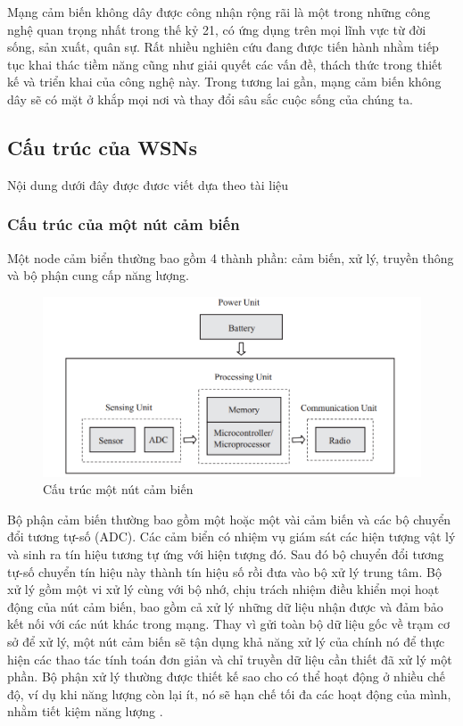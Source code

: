 \documentclass{article}
\begin{document}
Mạng cảm biến không dây được công nhận rộng rãi là một trong những công nghệ quan trọng nhất trong thế kỷ 21, có ứng dụng trên mọi lĩnh vực từ đời sống, sản xuất, quân sự. Rất nhiều nghiên cứu đang được tiến hành nhằm tiếp tục khai thác tiềm năng cũng như giải quyết các vấn đề, thách thức trong thiết kế và triển khai của công nghệ này. Trong tương lai gần, mạng cảm biến không dây sẽ có mặt ở khắp mọi nơi và thay đổi sâu sắc cuộc sống của chúng ta. 

\subsection{Cấu trúc của \gls{WSNs}}
Nội dung dưới đây được đươc viết dựa theo tài liệu \cite{architecture}
\subsubsection{Cấu trúc của một nút cảm biến}
Một node cảm biển thường bao gồm 4 thành phần: cảm biến, xử lý, truyền thông và bộ phận cung cấp năng lượng. 
\begin{figure}[ht]
\includegraphics[width=\textwidth]{images/node-structure.PNG}
\caption{Cấu trúc một nút cảm biến \cite{architecture}}
\end{figure}
\newline Bộ phận cảm biến thường bao gồm một hoặc một vài cảm biến và các bộ chuyển đổi tương tự-số (ADC). Các cảm biển có nhiệm vụ giám sát các hiện tượng vật lý và sinh ra tín hiệu tương tự ứng với hiện tượng đó. Sau đó bộ chuyển đổi tương tự-số chuyển tín hiệu này thành tín hiệu số rồi đưa vào bộ xử lý trung tâm. 
\newline Bộ xử lý gồm một vi xử lý cùng với bộ nhớ, chịu trách nhiệm điều khiển mọi hoạt động của nút cảm biến, bao gồm cả xử lý những dữ liệu nhận được và đảm bảo kết nối với các nút khác trong mạng. Thay vì gửi toàn bộ dữ liệu gốc về trạm cơ sở để xử lý, một nút cảm biến sẽ tận dụng khả năng xử lý của chính nó để thực hiện các thao tác tính toán đơn giản và chỉ truyền dữ liệu cần thiết đã xử lý một phần. Bộ phận xử lý thường được thiết kế sao cho có thể hoạt động ở nhiều chế độ, ví dụ khi năng lượng còn lại ít, nó sẽ hạn chế tối đa các hoạt động của mình, nhằm tiết kiệm năng lượng .
\end{document}
